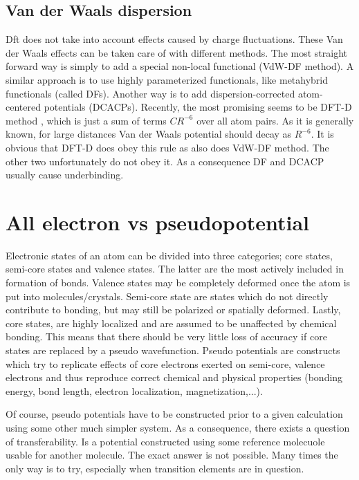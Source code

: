 \documentclass[openany, longbibliography,slovene,a4paper,12pt]{article}
\begin{document}
\subsection{Van der Waals dispersion}
Dft does not take into account effects caused by charge fluctuations. These Van
der Waals effects can be taken care of with different methods.
The most straight
forward way is simply to add a special non-local functional (VdW-DF method). A similar
approach is to use highly parameterized functionals, like metahybrid
functionals (called DFs). Another way is to add dispersion-corrected
atom-centered potentials (DCACPs). Recently, the most promising seems to be DFT-D method
\cite{consis_accur_ab_initio_param}, which is just a sum of terms $CR^{-6}$
over all atom pairs. As it is generally known, for large distances Van der Waals
potential should decay as $R^{-6}$. It is obvious that DFT-D does obey this
rule as also does VdW-DF method. The other two unfortunately do not obey it. As
a consequence DF and DCACP usually cause underbinding.


\section{All electron vs pseudopotential}
Electronic states of an atom can be divided into three categories; core states,
semi-core states and valence states. The latter are the most actively included
in formation of bonds. Valence states may be completely deformed once the atom
is put into molecules/crystals. Semi-core state are states which do not
directly contribute to bonding, but may still be polarized or spatially
deformed. Lastly, core states, are highly localized and are assumed to be
unaffected by chemical bonding. This means that there should be very little loss
of accuracy if core states are replaced by a pseudo wavefunction.
Pseudo potentials are constructs which try to
replicate effects of core electrons exerted on semi-core, valence electrons and
thus reproduce correct chemical and physical properties (bonding energy, bond
length, electron localization, magnetization,...).

Of course, pseudo potentials have to be constructed prior to a given calculation using
some other much simpler system. As a consequence, there
exists a question of transferability. Is a potential constructed using some
reference molecuole usable for another molecule. The exact answer is
not possible. Many times the only way is to try, especially when transition
elements are in question.
\end{document}
